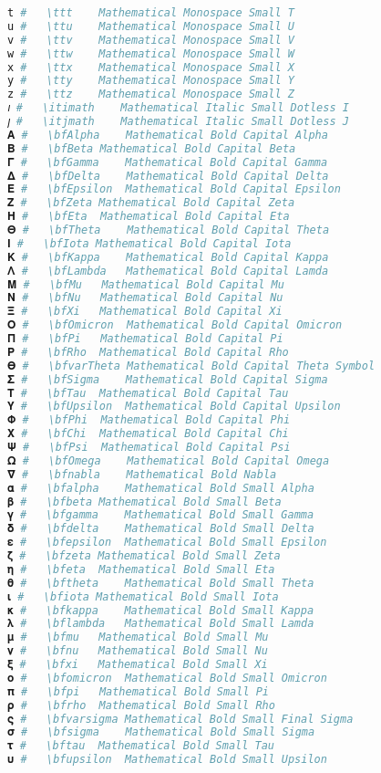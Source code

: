 \begin{lstlisting}[language=Julia, style=julia]
𝚝 #   \ttt    Mathematical Monospace Small T
𝚞 #   \ttu    Mathematical Monospace Small U
𝚟 #   \ttv    Mathematical Monospace Small V
𝚠 #   \ttw    Mathematical Monospace Small W
𝚡 #   \ttx    Mathematical Monospace Small X
𝚢 #   \tty    Mathematical Monospace Small Y
𝚣 #   \ttz    Mathematical Monospace Small Z
𝚤 #   \itimath    Mathematical Italic Small Dotless I
𝚥 #   \itjmath    Mathematical Italic Small Dotless J
𝚨 #   \bfAlpha    Mathematical Bold Capital Alpha
𝚩 #   \bfBeta Mathematical Bold Capital Beta
𝚪 #   \bfGamma    Mathematical Bold Capital Gamma
𝚫 #   \bfDelta    Mathematical Bold Capital Delta
𝚬 #   \bfEpsilon  Mathematical Bold Capital Epsilon
𝚭 #   \bfZeta Mathematical Bold Capital Zeta
𝚮 #   \bfEta  Mathematical Bold Capital Eta
𝚯 #   \bfTheta    Mathematical Bold Capital Theta
𝚰 #   \bfIota Mathematical Bold Capital Iota
𝚱 #   \bfKappa    Mathematical Bold Capital Kappa
𝚲 #   \bfLambda   Mathematical Bold Capital Lamda
𝚳 #   \bfMu   Mathematical Bold Capital Mu
𝚴 #   \bfNu   Mathematical Bold Capital Nu
𝚵 #   \bfXi   Mathematical Bold Capital Xi
𝚶 #   \bfOmicron  Mathematical Bold Capital Omicron
𝚷 #   \bfPi   Mathematical Bold Capital Pi
𝚸 #   \bfRho  Mathematical Bold Capital Rho
𝚹 #   \bfvarTheta Mathematical Bold Capital Theta Symbol
𝚺 #   \bfSigma    Mathematical Bold Capital Sigma
𝚻 #   \bfTau  Mathematical Bold Capital Tau
𝚼 #   \bfUpsilon  Mathematical Bold Capital Upsilon
𝚽 #   \bfPhi  Mathematical Bold Capital Phi
𝚾 #   \bfChi  Mathematical Bold Capital Chi
𝚿 #   \bfPsi  Mathematical Bold Capital Psi
𝛀 #   \bfOmega    Mathematical Bold Capital Omega
𝛁 #   \bfnabla    Mathematical Bold Nabla
𝛂 #   \bfalpha    Mathematical Bold Small Alpha
𝛃 #   \bfbeta Mathematical Bold Small Beta
𝛄 #   \bfgamma    Mathematical Bold Small Gamma
𝛅 #   \bfdelta    Mathematical Bold Small Delta
𝛆 #   \bfepsilon  Mathematical Bold Small Epsilon
𝛇 #   \bfzeta Mathematical Bold Small Zeta
𝛈 #   \bfeta  Mathematical Bold Small Eta
𝛉 #   \bftheta    Mathematical Bold Small Theta
𝛊 #   \bfiota Mathematical Bold Small Iota
𝛋 #   \bfkappa    Mathematical Bold Small Kappa
𝛌 #   \bflambda   Mathematical Bold Small Lamda
𝛍 #   \bfmu   Mathematical Bold Small Mu
𝛎 #   \bfnu   Mathematical Bold Small Nu
𝛏 #   \bfxi   Mathematical Bold Small Xi
𝛐 #   \bfomicron  Mathematical Bold Small Omicron
𝛑 #   \bfpi   Mathematical Bold Small Pi
𝛒 #   \bfrho  Mathematical Bold Small Rho
𝛓 #   \bfvarsigma Mathematical Bold Small Final Sigma
𝛔 #   \bfsigma    Mathematical Bold Small Sigma
𝛕 #   \bftau  Mathematical Bold Small Tau
𝛖 #   \bfupsilon  Mathematical Bold Small Upsilon

\end{lstlisting}
